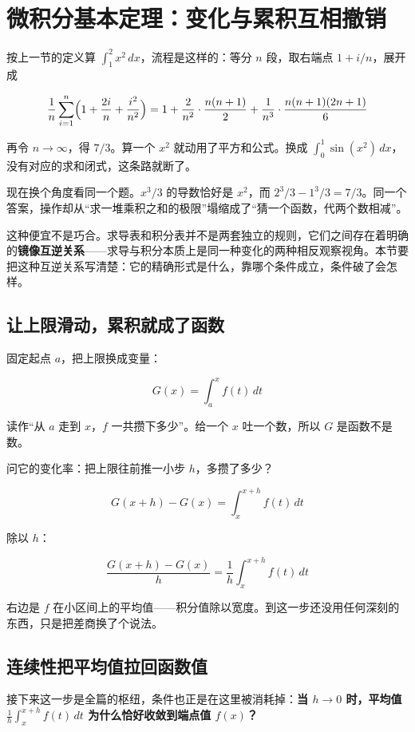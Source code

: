 \section{微积分基本定理：变化与累积互相撤销}
\label{sec:02-Calculus/04-Integration/02}

按上一节的定义算 \(\int_1^2 x^2\,dx\)，流程是这样的：等分 \(n\) 段，取右端点 \(1+i/n\)，展开成

\[
\frac1n\sum_{i=1}^n\Bigl(1+\frac{2i}{n}+\frac{i^2}{n^2}\Bigr) =1+\frac{2}{n^2}\cdot\frac{n(n+1)}{2}+\frac{1}{n^3}\cdot\frac{n(n+1)(2n+1)}{6}
\]

再令 \(n\to\infty\)，得 \(7/3\)。算一个 \(x^2\) 就动用了平方和公式。换成 \(\int_0^{1}\sin(x^2)\,dx\)，没有对应的求和闭式，这条路就断了。

现在换个角度看同一个题。\(x^3/3\) 的导数恰好是 \(x^2\)，而 \(2^3/3-1^3/3=7/3\)。同一个答案，操作却从``求一堆乘积之和的极限''塌缩成了``猜一个函数，代两个数相减''。

这种便宜不是巧合。求导表和积分表并不是两套独立的规则，它们之间存在着明确的\textbf{镜像互逆关系}——求导与积分本质上是同一种变化的两种相反观察视角。本节要把这种互逆关系写清楚：它的精确形式是什么，靠哪个条件成立，条件破了会怎样。

\subsection{让上限滑动，累积就成了函数}

固定起点 \(a\)，把上限换成变量：

\[
G(x)=\int_a^x f(t)\,dt
\]

读作``从 \(a\) 走到 \(x\)，\(f\) 一共攒下多少''。给一个 \(x\) 吐一个数，所以 \(G\) 是函数不是数。

问它的变化率：把上限往前推一小步 \(h\)，多攒了多少？

\[
G(x+h)-G(x)=\int_x^{x+h} f(t)\,dt
\]

除以 \(h\)：

\[
\frac{G(x+h)-G(x)}{h}=\frac1h\int_x^{x+h} f(t)\,dt
\]

右边是 \(f\) 在小区间上的平均值——积分值除以宽度。到这一步还没用任何深刻的东西，只是把差商换了个说法。

\subsection{连续性把平均值拉回函数值}

接下来这一步是全篇的枢纽，条件也正是在这里被消耗掉：\textbf{当 \(h \to 0\) 时，平均值 \(\frac1h\int_x^{x+h} f(t)\,dt\) 为什么恰好收敛到端点值 \(f(x)\)？}

